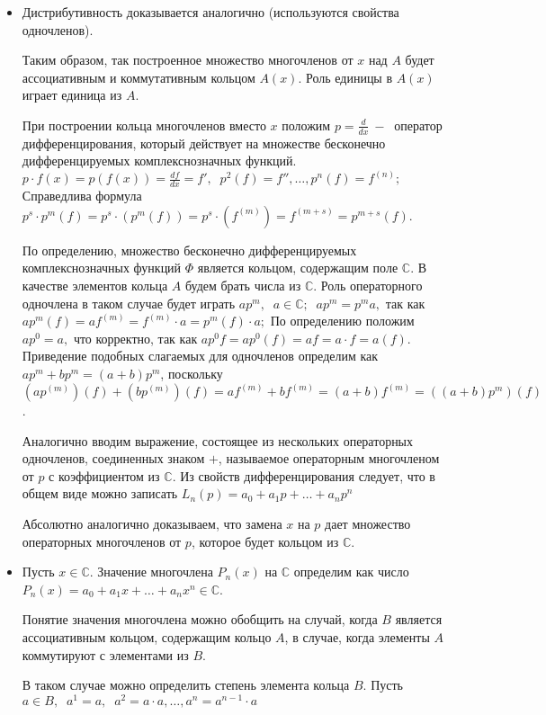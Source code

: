 \begin{itemize}
    \item Дистрибутивность доказывается аналогично (используются свойства одночленов).\par 
    Таким образом, так построенное множество многочленов от $x$ над $A$ будет ассоциативным и коммутативным кольцом $A(x)$. Роль единицы в $A(x)$ играет единица из $A$.\par
    При построении кольца многочленов вместо $x$ положим $p=\frac{d}{dx}~-~$ оператор дифференцирования, который действует на множестве бесконечно дифференцируемых комплекснозначных функций. $p\cdot f(x)=p(f(x))=\frac{df}{dx}=f', \;\;p^2(f)=f'', \dots, p^n(f)=f^{(n)};$ Справедлива формула $p^s\cdot p^m(f)=p^s\cdot (p^m(f))=p^s\cdot (f^{(m)})=f^{(m+s)}=p^{m+s}(f)$.\par
    По определению, множество бесконечно дифференцируемых комплекснозначных функций $\varPhi$ является кольцом, содержащим поле $\mathds{C}$. В качестве элементов кольца $A$ будем брать  числа из $\mathds{C}$.
    Роль операторного одночлена в таком случае будет играть $ap^m, \;\;a\in\mathds{C};\;\;ap^m=p^ma, $ так как $ap^m(f)=af^{(m)}=f^{(m)}\cdot a = p^m(f)\cdot a;$ По определению положим $ap^0=a, $ что корректно, так как $ap^0f=ap^0(f)=af=a\cdot f=a(f).$ Приведение подобных слагаемых для одночленов определим как $ap^m+bp^m=(a+b)p^m$, поскольку $(ap^{(m)})(f)+(bp^{(m)})(f)=af^{(m)}+bf^{(m)}=(a+b)f^{(m)}=((a+b)p^m)(f)$.\par
    Аналогично вводим выражение, состоящее из нескольких операторных одночленов, соединенных знаком $+$, называемое операторным многочленом от $p$ с коэффициентом из $\mathds{C}$. Из свойств дифференцирования следует, что в общем виде можно записать $L_n(p)=a_0+a_1p+\dots+a_np^n$\par
    Абсолютно аналогично доказываем, что замена $x$ на $p$ дает множество операторных многочленов от $p$, которое будет кольцом из $\mathds{C}$.
    
    \item Пусть $x \in \mathds{C}$. Значение многочлена $P_n(x)$ на $\mathds{C}$ определим как число $P_n(x) = a_0 + a_1 x + \dots + a_n x^{n} \in \mathds{C}$. \par
    Понятие значения многочлена можно обобщить на случай, когда $B$ является ассоциативным кольцом, содержащим кольцо $A$, в случае, когда элементы $A$ коммутируют с элементами из $B$.\par
    В таком случае можно определить степень элемента кольца $B$. Пусть $a\in B, \;\;a^1=a, \;\;a^2=a\cdot a, \dots, a^n=a^{n-1}\cdot a$
    

\end{itemize}
